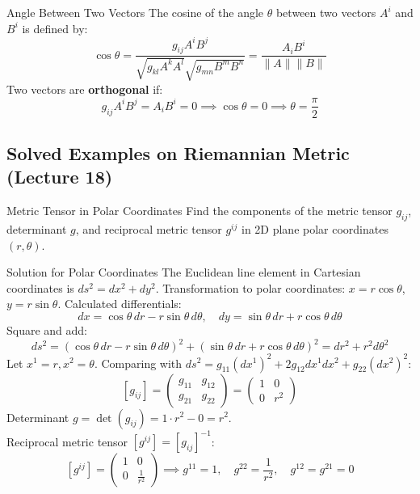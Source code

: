 \documentclass[11pt,a4paper]{article}
\begin{document}
\begin{definitionbox}{Angle Between Two Vectors}
The cosine of the angle $\theta$ between two vectors $A^i$ and $B^i$ is defined by:
\[
\cos \theta = \frac{g_{ij} A^i B^j}{\sqrt{g_{kl} A^k A^l} \sqrt{g_{mn} B^m B^n}} = \frac{A_i B^i}{\|A\| \|B\|}
\]
Two vectors are \textbf{orthogonal} if:
\[
g_{ij} A^i B^j = A_i B^i = 0 \implies \cos \theta = 0 \implies \theta = \frac{\pi}{2}
\]
\end{definitionbox}

\subsection{Solved Examples on Riemannian Metric (Lecture 18)}

\begin{examplebox}{Metric Tensor in Polar Coordinates}
Find the components of the metric tensor $g_{ij}$, determinant $g$, and reciprocal metric tensor $g^{ij}$ in 2D plane polar coordinates $(r, \theta)$.
\end{examplebox}
\begin{proofbox}{Solution for Polar Coordinates}
The Euclidean line element in Cartesian coordinates is $ds^2 = dx^2 + dy^2$.
Transformation to polar coordinates: $x = r \cos \theta$, $y = r \sin \theta$.
Calculated differentials:
\[
dx = \cos \theta \, dr - r \sin \theta \, d\theta, \quad dy = \sin \theta \, dr + r \cos \theta \, d\theta
\]
Square and add:
\[
ds^2 = (\cos \theta \, dr - r \sin \theta \, d\theta)^2 + (\sin \theta \, dr + r \cos \theta \, d\theta)^2 = dr^2 + r^2 d\theta^2
\]
Let $x^1 = r, x^2 = \theta$. Comparing with $ds^2 = g_{11} (dx^1)^2 + 2 g_{12} dx^1 dx^2 + g_{22} (dx^2)^2$:
\[
[g_{ij}] = \begin{pmatrix} g_{11} & g_{12} \\ g_{21} & g_{22} \end{pmatrix} = \begin{pmatrix} 1 & 0 \\ 0 & r^2 \end{pmatrix}
\]
Determinant $g = \det(g_{ij}) = 1 \cdot r^2 - 0 = r^2$. \\
Reciprocal metric tensor $[g^{ij}] = [g_{ij}]^{-1}$:
\[
[g^{ij}] = \begin{pmatrix} 1 & 0 \\ 0 & \frac{1}{r^2} \end{pmatrix} \implies g^{11} = 1, \quad g^{22} = \frac{1}{r^2}, \quad g^{12} = g^{21} = 0
\]
\end{proofbox}
\end{document}
